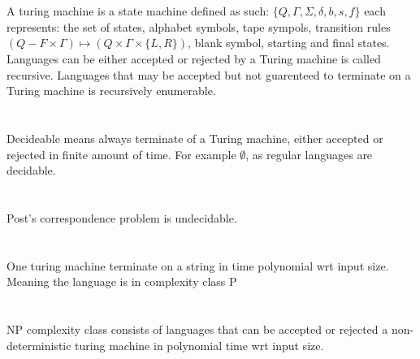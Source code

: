 \documentclass{article}
\begin{document}
\section{} 
A turing machine is a state machine defined as such: $\{Q, \Gamma, \Sigma, \delta, b, s, f\}$ each represents:
the set of states, alphabet symbols, tape sympols, transition rules $(Q - F\times \Gamma) \mapsto (Q\times \Gamma \times \{L, R\})$, blank symbol, starting and final states. 
Languages can be either accepted or rejected by a Turing machine is called recursive. Languages that may be accepted but not guarenteed to terminate on a Turing machine is recursively enumerable.
\section{}
Decideable means always terminate of a Turing machine, either accepted or rejected in finite amount of time. For example $\emptyset$, as regular languages are decidable. 
\section{}
Post's correspondence problem is undecidable. 
\section{}
One turing machine terminate on a string in time polynomial wrt input size. Meaning the language is in complexity class P
\section{}
NP complexity class consists of languages that can be accepted or rejected a non-deterministic turing machine in polynomial time wrt input size.
\end{document}
